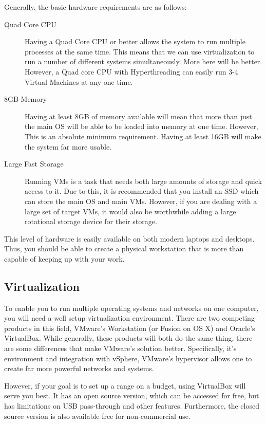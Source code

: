 			Generally, the basic hardware requirements are as follows:
			\begin{description}
				\item[Quad Core CPU] Having a Quad Core CPU or better allows the system to run multiple processes at the same time.
					This means that we can use virtualization to run a number of different systems simultaneously.
					More here will be better. However, a Quad core CPU with Hyperthreading can easily run 3-4 Virtual Machines at any one time.
				\item[8GB Memory] Having at least 8GB of memory available will mean that more than just the main OS will be able to be loaded into memory at one time.
					However, This is an absolute minimum requirement.
					Having at least 16GB will make the system far more usable.
				\item[Large Fast Storage] Running VMs is a task that needs both large amounts of storage and quick access to it.
					Due to this, it is recommended that you install an SSD which can store the main OS and main VMs.
					However, if you are dealing with a large set of target VMs, it would also be worthwhile adding a large rotational storage device for their storage.
			\end{description}

			This level of hardware is easily available on both modern laptops and desktops.
			Thus, you should be able to create a physical workstation that is more than capable of keeping up with your work.

		\subsection{Virtualization}
			To enable you to run multiple operating systems and networks on one computer, you will need a well setup virtualization environment.
			There are two competing products in this field, VMware's Workstation (or Fusion on OS X) and Oracle's VirtualBox.
			While generally, these products will both do the same thing, there are some differences that make VMware's solution better.
			Specifically, it's environment and integration with vSphere, VMware's hypervisor allows one to create far more powerful networks and systems.

			However, if your goal is to set up a range on a budget, using VirtualBox will serve you best.
			It has an open source version, which can be accessed for free, but has limitations on USB pass-through and other features.
			Furthermore, the closed source version is also available free for non-commercial use.

